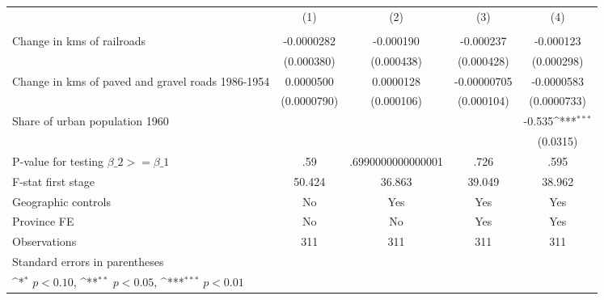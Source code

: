 {
\def\sym#1{\ifmmode^{#1}\else\(^{#1}\)\fi}
\begin{tabular}{l*{4}{c}}
\hline\hline
                &\multicolumn{1}{c}{(1)}&\multicolumn{1}{c}{(2)}&\multicolumn{1}{c}{(3)}&\multicolumn{1}{c}{(4)}\\
                &\multicolumn{1}{c}{}&\multicolumn{1}{c}{}&\multicolumn{1}{c}{}&\multicolumn{1}{c}{}\\
\hline
Change in kms of railroads&-0.0000282         &-0.000190         &-0.000237         &-0.000123         \\
                &(0.000380)         &(0.000438)         &(0.000428)         &(0.000298)         \\
[1em]
Change in kms of paved and gravel roads 1986-1954&0.0000500         &0.0000128         &-0.00000705         &-0.0000583         \\
                &(0.0000790)         &(0.000106)         &(0.000104)         &(0.0000733)         \\
[1em]
Share of urban population 1960&                  &                  &                  &   -0.535\sym{***}\\
                &                  &                  &                  & (0.0315)         \\
\hline
P-value for testing $\beta\_{2} >= \beta\_{1}$&      .59         &.6990000000000001         &     .726         &     .595         \\
F-stat first stage&   50.424         &   36.863         &   39.049         &   38.962         \\
Geographic controls&       No         &      Yes         &      Yes         &      Yes         \\
Province FE     &       No         &       No         &      Yes         &      Yes         \\
Observations    &      311         &      311         &      311         &      311         \\
\hline\hline
\multicolumn{5}{l}{\footnotesize Standard errors in parentheses}\\
\multicolumn{5}{l}{\footnotesize \sym{*} \(p<0.10\), \sym{**} \(p<0.05\), \sym{***} \(p<0.01\)}\\
\end{tabular}
}
